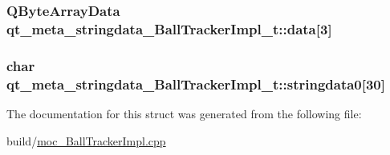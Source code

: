 \subsubsection[{\texorpdfstring{data}{data}}]{\setlength{\rightskip}{0pt plus 5cm}Q\+Byte\+Array\+Data qt\+\_\+meta\+\_\+stringdata\+\_\+\+Ball\+Tracker\+Impl\+\_\+t\+::data\mbox{[}3\mbox{]}}\hypertarget{structqt__meta__stringdata___ball_tracker_impl__t_aaa7d7ef4a4a293040f1ceb14790880db}{}\label{structqt__meta__stringdata___ball_tracker_impl__t_aaa7d7ef4a4a293040f1ceb14790880db}
\subsubsection[{\texorpdfstring{stringdata0}{stringdata0}}]{\setlength{\rightskip}{0pt plus 5cm}char qt\+\_\+meta\+\_\+stringdata\+\_\+\+Ball\+Tracker\+Impl\+\_\+t\+::stringdata0\mbox{[}30\mbox{]}}\hypertarget{structqt__meta__stringdata___ball_tracker_impl__t_a04a60b2f79a2e3d26ef56213f357c24f}{}\label{structqt__meta__stringdata___ball_tracker_impl__t_a04a60b2f79a2e3d26ef56213f357c24f}


The documentation for this struct was generated from the following file\+:\begin{DoxyCompactItemize}
\item 
build/\hyperlink{moc___ball_tracker_impl_8cpp}{moc\+\_\+\+Ball\+Tracker\+Impl.\+cpp}\end{DoxyCompactItemize}
